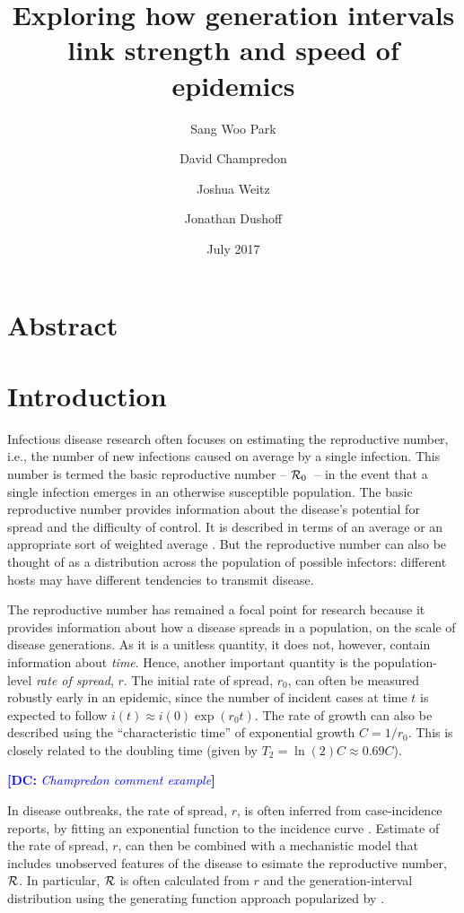 \documentclass[12pt,]{article}
\title{Exploring how generation intervals link strength and speed of epidemics}
\author{Sang Woo Park \and David Champredon \and Joshua Weitz \and Jonathan Dushoff}
\date{July 2017}
\newcommand{\RR}{\ensuremath{{\cal R}}}
\newcommand{\Rx}[1]{\ensuremath{{\cal R}_{#1}}}
\newcommand{\Ro}{\Rx{0}}
\newcommand{\Tc}{\ensuremath{C}}
\newcommand{\comment}[3]{\textcolor{#1}{\textbf{[#2: }\textit{#3}\textbf{]}}}
\newcommand{\dc}[1]{\comment{blue}{DC}{#1}}
\begin{document}
\maketitle

\section*{Abstract}

\section{Introduction}

Infectious disease research often focuses on estimating the reproductive number, i.e., the number of new infections caused on average by a single infection.
This number is termed the basic reproductive number -- \Ro\ -- in the event that a single infection emerges in an otherwise susceptible population.
The basic reproductive number provides information about the disease's potential for spread and the difficulty of control.
It is described in terms of an average \cite{AndeMay91} or an appropriate sort of weighted average \cite{DiekHees90}.
But the reproductive number can also be thought of as a distribution across the population of possible infectors: different hosts may have different tendencies to transmit disease.

The reproductive number has remained a focal point for research because it provides information about how a disease spreads in a population, on the scale of disease generations.
As it is a unitless quantity, it does not, however, contain information about \emph{time}.
Hence, another important quantity is the population-level \emph{rate of spread}, $r$. The initial rate of spread, $r_0$, can often be measured robustly early in an epidemic, since the number of incident cases at time $t$ is expected to follow $i(t) \approx i(0) \exp(r_0t)$. The rate of growth can also be described using the ``characteristic time'' of exponential growth $\Tc = 1/r_0$. This is closely related to the doubling time (given by $T_2 = \ln(2) \Tc \approx 0.69 \Tc$).

\dc{Champredon comment example}

In disease outbreaks, the rate of spread, $r$, is often inferred from case-incidence reports, by fitting an exponential function to the incidence curve \cite{MillRobi04, NishCast09, MaJDush14}.
Estimate of the rate of spread, $r$, can then be combined with a mechanistic model that includes unobserved features of the disease to esimate the reproductive number, \RR.
In particular, $\RR$ is often calculated from $r$ and the generation-interval distribution using the generating function approach popularized by \cite{WallLips07}.
\end{document}
